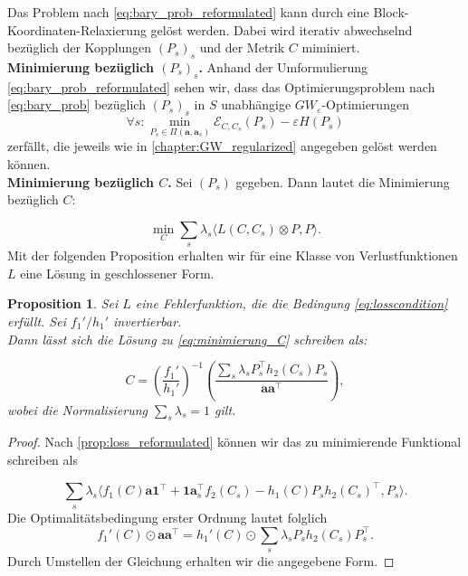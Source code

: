 \documentclass[twoside, 12pt,a4paper]{book}
\newtheorem{proposition}[theorem]{Proposition}
\numberwithin{equation}{section}
\begin{document}
	\noindent Das Problem nach \eqref{eq:bary_prob_reformulated} kann durch eine Block-Koordinaten-Relaxierung gelöst werden. Dabei wird iterativ abwechselnd bezüglich der Kopplungen $(P_s)_s$ und der Metrik $C$ miminiert.\\
	
	\noindent \textbf{Minimierung bezüglich $(P_s)_s$.}
	Anhand der Umformulierung \eqref{eq:bary_prob_reformulated} sehen wir, dass das Optimierungsproblem nach \eqref{eq:bary_prob} bezüglich $(P_s)_s$ in $S$ unabhängige $GW_\varepsilon$-Optimierungen
	\begin{equation}
	\forall s : \min_{P_s \in \Pi(\boldsymbol{a},\boldsymbol{a}_s)}{\mathcal{E}_{C,C_s}(P_s)- \varepsilon H(P_s)}
	\end{equation}
	zerfällt, die jeweils wie in \autoref{chapter:GW_regularized} angegeben gelöst werden können.\\
	
	\noindent \textbf{Minimierung bezüglich $C$.} Sei $(P_s)$ gegeben. Dann lautet die Minimierung bezüglich $C$:
	
	\begin{equation}
	\min_C \sum_s{\lambda_s \langle L(C,C_s) \otimes P,P \rangle}. \label{eq:minimierung_C}
	\end{equation}
	Mit der folgenden Proposition erhalten wir für eine Klasse von Verlustfunktionen $L$ eine Lösung in geschlossener Form.
	
	
	\begin{proposition} \cite{gwd_averaging_kernels}
		Sei $L$ eine Fehlerfunktion, die die Bedingung \eqref{eq:losscondition} erfüllt. Sei $f_1'/h_1'$ invertierbar. \\
		Dann lässt sich die Lösung zu \eqref{eq:minimierung_C} schreiben als:
		
		\begin{equation}
		C = \left(\frac{f_1'}{h_1'}\right)^{-1} \left(\frac{\sum_s{\lambda_s P_s^\top h_2(C_s)P_s}}{\boldsymbol{a}\boldsymbol{a}^\top}\right),
		\label{eq:sol_bary}
		\end{equation}
		wobei die Normalisierung $\sum_s {\lambda_s} = 1$ gilt.
	\end{proposition}
	\begin{proof}
		Nach \eqref{prop:loss_reformulated} können wir das zu minimierende Funktional schreiben als
		
		\begin{equation}
		\sum_s{\lambda_s \langle f_1(C)\boldsymbol{a}\boldsymbol{1}^\top + \boldsymbol{1}\boldsymbol{a}_s^\top f_2(C_s) - h_1(C)P_s h_2(C_s)^\top , P_s \rangle}.
		\end{equation}
		Die Optimalitätsbedingung erster Ordnung lautet folglich 
		\begin{equation}
		f_1'(C) \odot \boldsymbol{a}\boldsymbol{a}^\top = h_1'(C) \odot \sum_s{\lambda_s P_sh_2(C_s)P_s^\top}.
		\end{equation}
		Durch Umstellen der Gleichung erhalten wir die angegebene Form.
	\end{proof}
	
\end{document}
